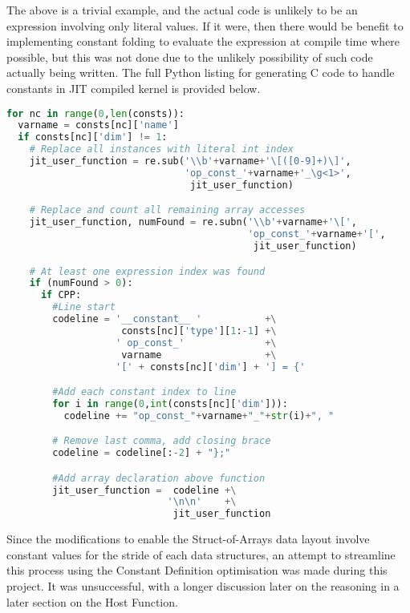 The above is a trivial example, and the actual code is unlikely to be an expression involving only literal values. If it were, then there would be benefit to implementing constant folding \cite{constFold} to evaluate the expression at compile time where possible, but this was not done due to the unlikely possibility of such code actually being written.
\clearpage
\noindent The full Python listing for generating C code to handle constants in JIT compiled kernel is provided below.
\begin{lstlisting}[backgroundcolor = \color{lightgray!20}, language=Python]
for nc in range(0,len(consts)):
  varname = consts[nc]['name']
  if consts[nc]['dim'] != 1:
    # Replace all instances with literal int index
    jit_user_function = re.sub('\\b'+varname+'\[([0-9]+)\]',
                               'op_const_'+varname+'_\g<1>',
                                jit_user_function)

    # Replace and count all remaining array accesses
    jit_user_function, numFound = re.subn('\\b'+varname+'\[',
                                          'op_const_'+varname+'[',
                                           jit_user_function)

    # At least one expression index was found
    if (numFound > 0):
      if CPP:
        #Line start
        codeline = '__constant__ '           +\
                    consts[nc]['type'][1:-1] +\
                   ' op_const_'              +\
                    varname                  +\
                   '[' + consts[nc]['dim'] + '] = {'

        #Add each constant index to line
        for i in range(0,int(consts[nc]['dim'])):
          codeline += "op_const_"+varname+"_"+str(i)+", "

        # Remove last comma, add closing brace
        codeline = codeline[:-2] + "};"

        #Add array declaration above function
        jit_user_function =  codeline +\
                            '\n\n'    +\
                             jit_user_function
\end{lstlisting}

\tinytitle{SoA optimisation}
Since the modifications to enable the Struct-of-Arrays data layout involve constant values for the stride of each data structures, an attempt to streamline this process using the Constant Definition optimisation was made during this project. It was unsuccessful, with a longer discussion later on the reasoning in a later section on the Host Function.
\par


